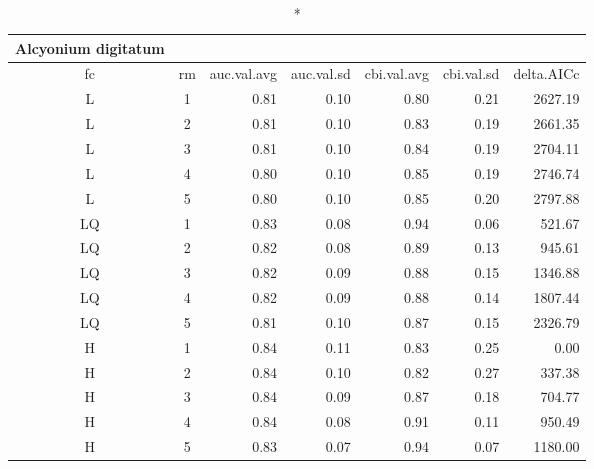 \captionsetup[table]{labelformat=empty,skip=1pt}
\begin{longtable}{ccrrrrr}
\caption*{
{\large Alcyonium digitatum}
} \\ 
\toprule
fc & rm & auc.val.avg & auc.val.sd & cbi.val.avg & cbi.val.sd & delta.AICc \\ 
\midrule
L & 1 & 0.81 & 0.10 & 0.80 & 0.21 & 2627.19 \\ 
L & 2 & 0.81 & 0.10 & 0.83 & 0.19 & 2661.35 \\ 
L & 3 & 0.81 & 0.10 & 0.84 & 0.19 & 2704.11 \\ 
L & 4 & 0.80 & 0.10 & 0.85 & 0.19 & 2746.74 \\ 
L & 5 & 0.80 & 0.10 & 0.85 & 0.20 & 2797.88 \\ 
LQ & 1 & 0.83 & 0.08 & 0.94 & 0.06 & 521.67 \\ 
LQ & 2 & 0.82 & 0.08 & 0.89 & 0.13 & 945.61 \\ 
LQ & 3 & 0.82 & 0.09 & 0.88 & 0.15 & 1346.88 \\ 
LQ & 4 & 0.82 & 0.09 & 0.88 & 0.14 & 1807.44 \\ 
LQ & 5 & 0.81 & 0.10 & 0.87 & 0.15 & 2326.79 \\ 
H & 1 & 0.84 & 0.11 & 0.83 & 0.25 & 0.00 \\ 
H & 2 & 0.84 & 0.10 & 0.82 & 0.27 & 337.38 \\ 
H & 3 & 0.84 & 0.09 & 0.87 & 0.18 & 704.77 \\ 
H & 4 & 0.84 & 0.08 & 0.91 & 0.11 & 950.49 \\ 
H & 5 & 0.83 & 0.07 & 0.94 & 0.07 & 1180.00 \\ 
 \bottomrule
\end{longtable}

